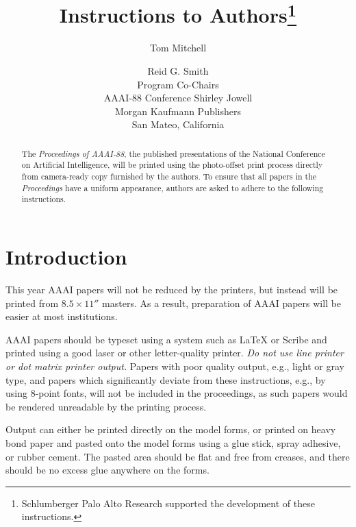 
\title{Instructions to Authors\thanks{Schlumberger Palo Alto Research
supported the development of these instructions.}}
\author{Tom Mitchell \and Reid G. Smith  \\
	Program Co-Chairs \\ AAAI-88 Conference
	\And
	Shirley Jowell \\
	Morgan Kaufmann Publishers \\
	San Mateo, California}



\maketitle

\begin{abstract}
The {\em Proceedings of AAAI-88}, the published presentations of
    the National Conference on Artificial Intelligence, will be
    printed using the photo-offset print process directly from 
    camera-ready copy furnished by the authors.
    To ensure that all papers in the {\em Proceedings} have a uniform
    appearance, authors are asked to adhere to the following
    instructions.
\end{abstract}


\section{Introduction}

This year AAAI papers will not be reduced by the printers,
but instead will be printed from $8.5 \times 11''$ masters.
As a result, preparation of AAAI papers will be easier at most
institutions.

AAAI papers should be typeset using a system such as \LaTeX{} or Scribe
and printed using a good laser or other letter-quality printer.
{\em Do not use line printer or dot matrix printer output.}
Papers with poor quality output, e.g., light or gray type, 
and papers which significantly deviate from these instructions,
e.g., by using 8-point fonts,
will not be included in the proceedings,
as such papers would be rendered
unreadable by the printing process.

Output can either be printed directly on the model forms, 
or printed on heavy bond paper and pasted onto
the model forms using a glue stick, spray adhesive, or rubber cement.
The pasted area should be flat and free from creases, 
and there should be no excess glue anywhere on the forms.

